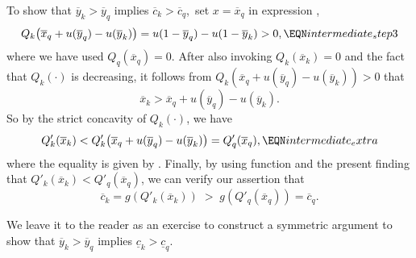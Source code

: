 To show that $\overline y_k > \overline y_q$ implies
$\overline c_k > \overline c_q$,\ set $x=\overline x_q$ in expression
,
$$ Q_k\!\left(\overline x_q +u(\overline y_q) - u(\overline y_k) \right)
= u(1-\overline y_q) - u(1-\overline y_k) > 0,           \EQN intermediate_step3
$$
where we have used $Q_q(\overline x_q) = 0$. After also invoking
$Q_k(\overline x_k) = 0$ and the fact that $Q_k(\cdot)$ is
decreasing, it follows from
$ Q_k\!\left(\overline x_q +u(\overline y_q) - u(\overline y_k) \right) > 0$
that
$$
\overline x_k > \overline x_q +u(\overline y_q) - u(\overline y_k).
$$
So by the strict concavity of $Q_k(\cdot)$, we have
$$
Q'_k(\overline x_k) < Q'_k\!\left(\overline x_q +u(\overline y_q) - u(\overline y_k)\right)
= Q'_q(\overline x_q),                         \EQN intermediate_extra
$$
where the equality is given by .
Finally, by using function  and the present
finding that $Q'_k(\overline x_k) < Q'_q(\overline x_q)$, we can verify our
assertion that
$$
\overline c_k = g\!\left(Q'_k(\overline x_k)\right) \; > \;
g\!\left(Q'_q(\overline x_q)\right) = \overline c_q.
$$


 We leave it to the reader as an
exercise to construct a symmetric argument to show that $\overline
y_k > \overline y_q$ implies $\underline c_k > \underline c_q$.



